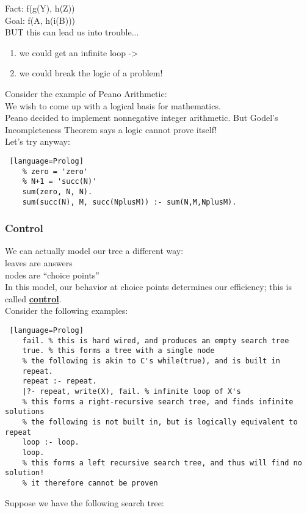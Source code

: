 \documentclass[../../lecture_notes.tex]{subfiles}
\begin{document}
\begin{center}  \end{center}		

\indent Fact: f(g(Y), h(Z))\\
\indent Goal: f(A, h(i(B)))\\
BUT this can lead us into trouble...
\begin{enumerate} [itemsep=0mm]
	\item we could get an infinite loop ->
	\item we could break the logic of a problem!
\end{enumerate}
\noindent Consider the example of Peano Arithmetic:\\
	\indent We wish to come up with a logical basis for mathematics.\\
	\indent Peano decided to implement nonnegative integer arithmetic.
	\indent But Godel's Incompleteness Theorem says a logic cannot prove itself!\\
 Let's try anyway:
 \begin{lstlisting} [language=Prolog]
	% zero = 'zero'
	% N+1 = 'succ(N)'
	sum(zero, N, N).
 	sum(succ(N), M, succ(NplusM)) :- sum(N,M,NplusM).
\end{lstlisting}

\subsubsection*{Control}
\noindent We can actually model our tree a different way:\\
	\indent leaves are answers\\
	\indent nodes are “choice points”\\
In this model, our behavior at choice points determines our efficiency; this is called \textbf{\underline{control}}.\\
Consider the following examples:
\begin{lstlisting} [language=Prolog]
	fail. % this is hard wired, and produces an empty search tree
 	true. % this forms a tree with a single node
 	% the following is akin to C's while(true), and is built in
 	repeat.
 	repeat :- repeat.
 	|?- repeat, write(X), fail. % infinite loop of X's
 	% this forms a right-recursive search tree, and finds infinite solutions
 	% the following is not built in, but is logically equivalent to repeat
 	loop :- loop.
 	loop.
 	% this forms a left recursive search tree, and thus will find no solution!
 	% it therefore cannot be proven
\end{lstlisting}
\noindent Suppose we have the following search tree:
\end{document}
